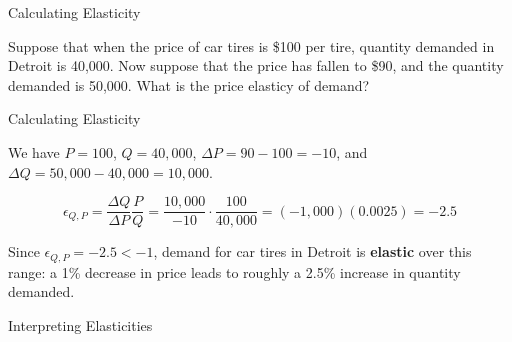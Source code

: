 \documentclass[12pt,t]{beamer}
\begin{document}
\begin{frame}{Calculating Elasticity}

\bigskip
Suppose that when the price of car tires is \$100 per tire, quantity demanded in Detroit is 40,000. Now suppose that the price has fallen to \$90, and the quantity demanded is 50,000. What is the price elasticy of demand?


\end{frame}

\begin{frame}{Calculating Elasticity}

\bigskip
We have $P = 100$, $Q = 40,000$, $\Delta P = 90 - 100 = -10$, and $\Delta Q = 50,000 - 40,000 = 10,000$.

$$
  \epsilon_{Q,P} = \frac{\Delta Q}{\Delta P}\frac{P}{Q} = \frac{10,000}{-10} \cdot \frac{100}{40,000} = (-1,000)(0.0025) = -2.5
$$

\bigskip
Since $\epsilon_{Q,P} = -2.5 < -1$, demand for car tires in Detroit is \textbf{elastic} over this range: a 1\% decrease in price leads to roughly a 2.5\% increase in quantity demanded.
\end{frame}

\begin{frame}{Interpreting Elasticities}
  \bigskip

\end{frame}
\end{document}
